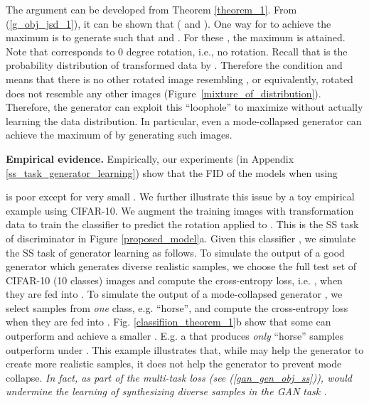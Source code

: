 \documentclass{article}
\begin{document}
The argument can be developed from Theorem \ref{theorem_1}. From (\ref{g_obj_jsd_1}),
it can be shown that
 ( and ).
One way for  to achieve the maximum is to generate 
such that 
 and 
.
For these , the maximum 
 is attained. Note that  corresponds to 0 degree rotation, i.e., no rotation.
Recall that 
 is the probability distribution of transformed data by .
Therefore the condition 
 and 
means that there is no other rotated image resembling  , or equivalently, rotated  does not resemble any other images (Figure~\ref{mixture_of_distribution}). Therefore, the generator can exploit this ``loophole'' to maximize  without actually learning the data distribution. 
In particular, even a mode-collapsed generator can achieve the maximum of  by generating such images.


{\bf Empirical evidence.}
Empirically, our experiments (in Appendix \ref{ss_task_generator_learning}) show that  the FID of the models when using 

is poor except for very small
.
We further illustrate this issue by a toy empirical example using CIFAR-10.
We augment the  training images  with transformation data  to train the classifier  to predict 
the rotation applied to .
This is the SS task of discriminator in 
Figure \ref{proposed_model}a.
Given this classifier , we simulate the SS task of generator learning as follows.
To simulate the output of a good generator  which generates diverse realistic samples, we choose the full test set of CIFAR-10 (10 classes) images and compute the cross-entropy loss, i.e. , when they are fed into . 
To simulate the output of a mode-collapsed generator , we select samples from {\em one} class, e.g. ``horse'', and compute the cross-entropy loss when they are fed into .
Fig. \ref{classifiion_theorem_1}b show that some  can outperform  and achieve a smaller . E.g. a  that produces {\em only} ``horse'' samples outperform  under .  This example illustrates that, while 
 may help the generator to create more realistic samples, it does not help the generator to prevent mode collapse. {\em In fact, as part of the multi-task loss
(see (\ref{gan_gen_obj_ss})),  would undermine the learning of synthesizing diverse samples in the GAN task .}
\end{document}
